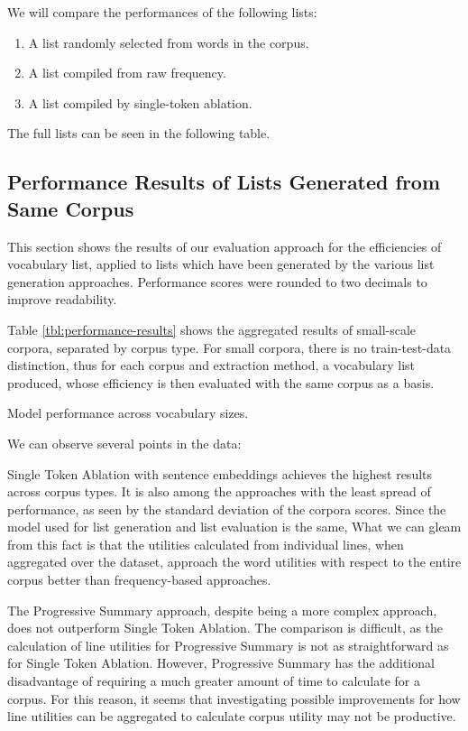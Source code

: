We will compare the performances of the following lists:
\begin{enumerate}
	\item A list randomly selected from words in the corpus.
	\item A list compiled from raw frequency.
	\item A list compiled by single-token ablation.
\end{enumerate}

The full lists can be seen in the following table.

\subsection{Performance Results of Lists Generated from Same Corpus} \label{sec:results-same-corpus}

This section shows the results of our evaluation approach for the efficiencies of vocabulary list, applied to lists which have been generated by the various list generation approaches.
Performance scores were rounded to two decimals to improve readability.


Table \ref{tbl:performance-results} shows the aggregated results of small-scale corpora, separated by corpus type.
For small corpora, there is no train-test-data distinction, thus for each corpus and extraction method, a vocabulary list produced, whose efficiency is then evaluated with the same corpus as a basis.

\begin{table}[ht]
	\centering
	
	\caption{Model performance across vocabulary sizes.}
	\label{tbl:performance-results}
\end{table}

We can observe several points in the data:

Single Token Ablation with sentence embeddings achieves the highest results across corpus types.
It is also among the approaches with the least spread of performance, as seen by the standard deviation of the corpora scores.
Since the model used for list generation and list evaluation is the same,
What we can gleam from this fact is that the utilities calculated from individual lines, when aggregated over the dataset, approach the word utilities with respect to the entire corpus better than frequency-based approaches.

The Progressive Summary approach, despite being a more complex approach, does not outperform Single Token Ablation.
The comparison is difficult, as the calculation of line utilities for Progressive Summary is not as straightforward as for Single Token Ablation.
However, Progressive Summary has the additional disadvantage of requiring a much greater amount of time to calculate for a corpus.
For this reason, it seems that investigating possible improvements for how line utilities can be aggregated to calculate corpus utility may not be productive.

